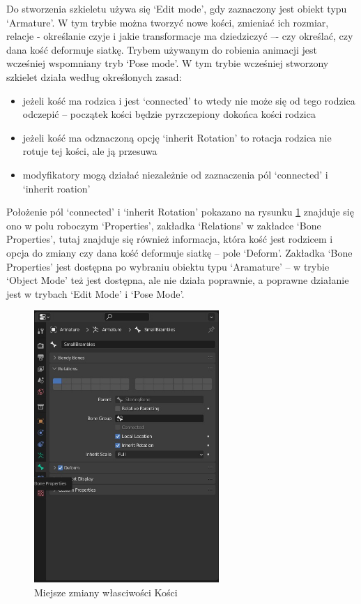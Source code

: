 \documentclass[12pt,twoside]{article}
\begin{document}
Do stworzenia szkieletu używa się `Edit mode', gdy zaznaczony jest obiekt typu
`Armature'. W tym trybie można tworzyć nowe kości, zmieniać ich rozmiar, relacje
- określanie czyje i jakie transformacje ma dziedziczyć –- czy określać, czy dana
kość deformuje siatkę. Trybem używanym do robienia animacji jest wcześniej
wspomniany tryb `Pose mode'. W tym trybie wcześniej stworzony szkielet działa
według określonych zasad:
\begin{itemize}
\item jeżeli kość ma rodzica i jest `connected' to wtedy nie może się od tego
rodzica odczepić -- początek kości będzie pyrzczepiony dokońca kości rodzica
\item jeżeli kość ma odznaczoną opcję `inherit Rotation' to rotacja rodzica nie
rotuje tej kości, ale ją przesuwa
\item modyfikatory mogą działać niezależnie od zaznaczenia pól `connected' i
`inherit roation'
\end{itemize}
Położenie pól `connected' i `inherit Rotation' pokazano na rysunku
\ref{Blender:ConnectedInherit} znajduje się ono w polu roboczym `Properties',
zakładka `Relations' w zakładce `Bone Properties', tutaj znajduje się
również informacja, która kość jest rodzicem i opcja do zmiany czy dana kość
deformuje siatkę -- pole `Deform'. Zakładka `Bone Properties' jest dostępna po wybraniu
obiektu typu `Aramature' -- w trybie `Object Mode' też jest dostępna, ale nie
działa poprawnie, a poprawne działanie jest w trybach `Edit Mode' i `Pose Mode'.

\begin{figure}[ht]
    \centering
    \includegraphics[width=7cm]{BlenderPict/Bone_Properties.jpg}
    \caption{Miejsze zmiany własciwości Kości}
    \label{Blender:ConnectedInherit}
\end{figure}
\end{document}
